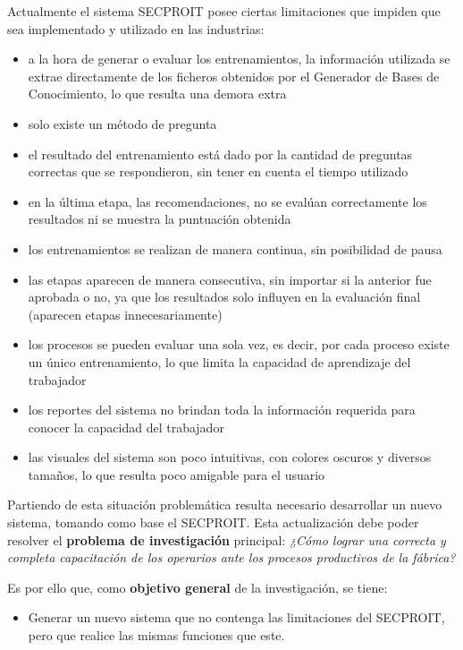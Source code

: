 Actualmente el sistema SECPROIT posee ciertas limitaciones que impiden que sea implementado y utilizado en las industrias:
\begin{itemize}
\item a la hora de generar o evaluar los entrenamientos, la información utilizada se extrae directamente de los ficheros obtenidos por el Generador de Bases de Conocimiento, lo que resulta una demora extra
\item solo existe un método de pregunta
\item el resultado del entrenamiento está dado por la cantidad de preguntas correctas que se respondieron, sin tener en cuenta el tiempo utilizado
\item en la última etapa, las recomendaciones, no se evalúan correctamente los resultados ni se muestra la puntuación obtenida
\item los entrenamientos se realizan de manera continua, sin posibilidad de pausa
\item las etapas aparecen de manera consecutiva, sin importar si la anterior fue aprobada o no, ya que los resultados solo influyen en la evaluación final (aparecen etapas innecesariamente)
\item los procesos se pueden evaluar una sola vez, es decir, por cada proceso existe un único entrenamiento, lo que limita la capacidad de aprendizaje del trabajador
\item los reportes del sistema no brindan toda la información requerida para conocer la capacidad del trabajador
\item las visuales del sistema son poco intuitivas, con colores oscuros y diversos tamaños, lo que resulta poco amigable para el usuario
\end{itemize}


Partiendo de esta situación problemática resulta necesario desarrollar un nuevo sistema, tomando como base el SECPROIT. Esta actualización debe poder resolver el \textbf{problema de investigación} principal: \textsl{¿Cómo lograr una correcta y completa capacitación de los operarios ante los procesos productivos de la fábrica?}

Es por ello que, como \textbf{objetivo general} de la investigación, se tiene:
\begin{itemize}
\item Generar un nuevo sistema que no contenga las limitaciones del SECPROIT, pero que realice las mismas funciones que este.
\end{itemize}

